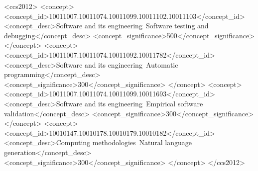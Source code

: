 \documentclass[acmsmall]{acmart}
\begin{document}
\begin{CCSXML}
<ccs2012>
 <concept>
  <concept_id>10011007.10011074.10011099.10011102.10011103</concept_id>
  <concept_desc>Software and its engineering~Software testing and debugging</concept_desc>
  <concept_significance>500</concept_significance>
 </concept>
 <concept>
  <concept_id>10011007.10011074.10011092.10011782</concept_id>
  <concept_desc>Software and its engineering~Automatic programming</concept_desc>
  <concept_significance>300</concept_significance>
 </concept>
 <concept>
  <concept_id>10011007.10011074.10011099.10011693</concept_id>
  <concept_desc>Software and its engineering~Empirical software validation</concept_desc>
  <concept_significance>300</concept_significance>
 </concept>
 <concept>
  <concept_id>10010147.10010178.10010179.10010182</concept_id>
  <concept_desc>Computing methodologies~Natural language generation</concept_desc>
  <concept_significance>300</concept_significance>
 </concept>
</ccs2012>
\end{CCSXML}






\maketitle
\end{document}

